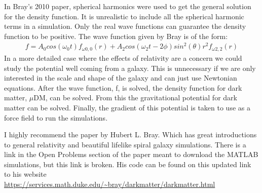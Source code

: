 \documentclass[11pt]{article}
\begin{document}
In Bray’s 2010 paper, spherical harmonics were used to get the general solution for the density function. It is unrealistic to include all the spherical harmonic terms in a simulation. Only the real wave functions can guarantee the density function to be positive. The wave function given by Bray is of the form:
\begin{align}
   f = A_0 cos(\omega_0t)f_{\omega0,0}(r) + A_2 cos(\omega_2t − 2\phi) sin^2(\theta)r^2f_{ω2,2}(r) 
\end{align}
In a more detailed case where the effects of relativity are a concern we could study the potential well coming from a galaxy. This is unnecessary if we are only interested in the scale and shape of the galaxy and can just use Newtonian equations. After the wave function, f, is solved, the density function for dark matter, $\mu$DM, can be solved. From this the gravitational potential for dark matter can be solved. Finally, the gradient of this potential is taken to use as a force field to run the simulations.

\newline
I highly recommend the paper by Hubert L. Bray. Which has great introductions to general relativity and beautiful lifelike spiral galaxy simulations. There is a link in the Open Problems section of the paper meant to download the MATLAB simulations, but this link is broken. His code can be found on this updated link to his website \url{https://services.math.duke.edu/~bray/darkmatter/darkmatter.html}
\end{document}
